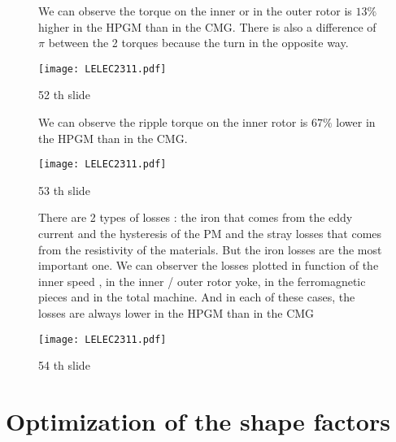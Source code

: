 \begin{figure}[H]
    \begin{minipage}{.45\linewidth}
  We can observe the torque on the inner or in the outer rotor is $13 \%$ higher in the HPGM than in the CMG. There is also a difference of $\pi$ between the 2 torques because the turn in the opposite way.
    \end{minipage}
    \hfill%
    \begin{minipage}[c]{.45\linewidth}
        \centering
        \texttt{[image: LELEC2311.pdf]}
        \caption{52 th slide}
    \end{minipage}
\end{figure}


\begin{figure}[H]
    \begin{minipage}{.45\linewidth}
  We can observe the ripple torque on the inner rotor is $67 \%$ lower in the HPGM than in the CMG. 
    \end{minipage}
    \hfill%
    \begin{minipage}[c]{.45\linewidth}
        \centering
        \texttt{[image: LELEC2311.pdf]}
        \caption{53 th slide}
    \end{minipage}
\end{figure}


\begin{figure}[H]
    \begin{minipage}{.45\linewidth}
  There are 2 types of losses : the iron that comes from the eddy current and the hysteresis of the PM and the stray losses that comes from the resistivity of the materials. But the iron losses are the most important one.
  We can observer the losses plotted in function of the inner speed , in the inner / outer rotor yoke, in the ferromagnetic pieces and in the total machine. And in each of these cases, the losses are always lower in the HPGM than in the CMG
    \end{minipage}
    \hfill%
    \begin{minipage}[c]{.45\linewidth}
        \centering
        \texttt{[image: LELEC2311.pdf]}
        \caption{54 th slide}
    \end{minipage}
\end{figure}

\section{Optimization of the shape factors}

